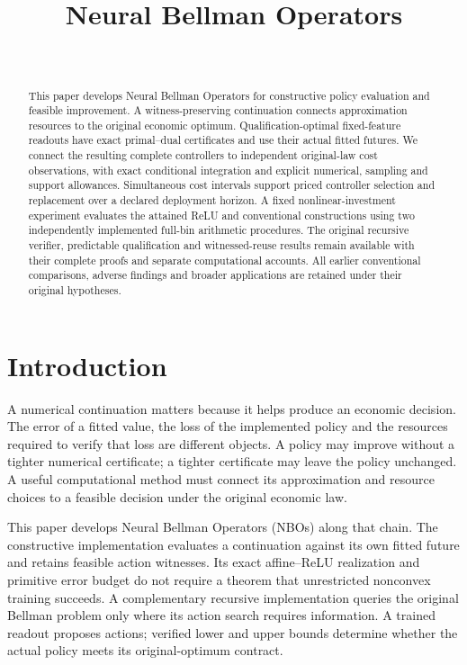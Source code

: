 \documentclass[ecta,nameyear,draft]{econsocart}
\begin{document}
\begin{frontmatter}
\title{Neural Bellman Operators}
\begin{aug}
\author[id=au1,addressref={add1}]{~}
\address[id=add1]{Peking University}
\end{aug}
\begin{abstract}
This paper develops Neural Bellman Operators for constructive policy evaluation and feasible improvement. A witness-preserving continuation connects approximation resources to the original economic optimum. Qualification-optimal fixed-feature readouts have exact primal--dual certificates and use their actual fitted futures. We connect the resulting complete controllers to independent original-law cost observations, with exact conditional integration and explicit numerical, sampling and support allowances. Simultaneous cost intervals support priced controller selection and replacement over a declared deployment horizon. A fixed nonlinear-investment experiment evaluates the attained ReLU and conventional constructions using two independently implemented full-bin arithmetic procedures. The original recursive verifier, predictable qualification and witnessed-reuse results remain available with their complete proofs and separate computational accounts. All earlier conventional comparisons, adverse findings and broader applications are retained under their original hypotheses.
\end{abstract}
\begin{keyword}
\end{keyword}
\end{frontmatter}
\section{Introduction}\label{sec:introduction65}
A numerical continuation matters because it helps produce an economic decision. The error of a fitted value, the loss of the implemented policy and the resources required to verify that loss are different objects. A policy may improve without a tighter numerical certificate; a tighter certificate may leave the policy unchanged. A useful computational method must connect its approximation and resource choices to a feasible decision under the original economic law.

This paper develops Neural Bellman Operators (NBOs) along that chain. The constructive implementation evaluates a continuation against its own fitted future and retains feasible action witnesses. Its exact affine--ReLU realization and primitive error budget do not require a theorem that unrestricted nonconvex training succeeds. A complementary recursive implementation queries the original Bellman problem only where its action search requires information. A trained readout proposes actions; verified lower and upper bounds determine whether the actual policy meets its original-optimum contract.
\end{document}
